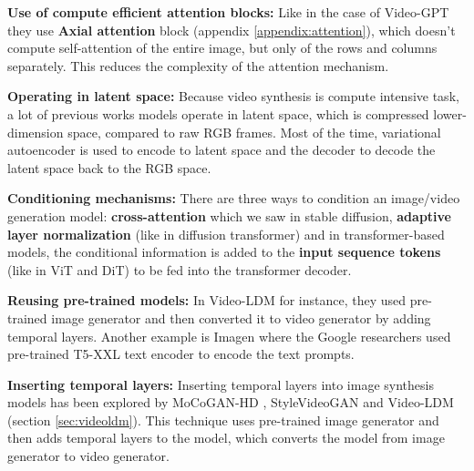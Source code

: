 \textbf{Use of compute efficient attention blocks:} Like in the case of Video-GPT they use \textbf{Axial attention} block (appendix \ref{appendix:attention}), which doesn't compute self-attention of the entire image, but only of the rows and columns separately. This reduces the complexity of the attention mechanism.

\textbf{Operating in latent space:} Because video synthesis is compute intensive task, a lot of previous works models operate in latent space, which is compressed lower-dimension space, compared to raw RGB frames. Most of the time, variational autoencoder is used to encode to latent space and the decoder to decode the latent space back to the RGB space.

\textbf{Conditioning mechanisms:} There are three ways to condition an image/video generation model: \textbf{cross-attention} which we saw in stable diffusion, \textbf{adaptive layer normalization} (like in diffusion transformer) and in transformer-based models, the conditional information is added to the \textbf{input sequence tokens} (like in ViT and DiT) to be fed into the transformer decoder.

\textbf{Reusing pre-trained models:} In Video-LDM for instance, they used pre-trained image generator and then converted it to video generator by adding temporal layers. Another example is Imagen where the Google researchers used pre-trained T5-XXL text encoder to encode the text prompts.

\textbf{Inserting temporal layers:} Inserting temporal layers into image synthesis models has been explored by MoCoGAN-HD \cite{mocogan_hd}, StyleVideoGAN \cite{style_video_gan} and Video-LDM \cite{video_ldm} (section \ref{sec:videoldm}). This technique uses pre-trained image generator and then adds temporal layers to the model, which converts the model from image generator to video generator.
